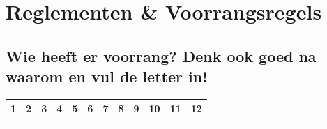 \chapter{Reglementen \& Voorrangsregels}
\vspace{-120px}
\section*{Wie heeft er voorrang? Denk ook goed na waarom en vul de letter in!}
\begin{table}[h!]
\centering
\begin{tabular}{l|l|l|l|l|l|l|l|l|l|l|l}
\textbf{1} & \textbf{2} & \textbf{3} & \textbf{4} & \textbf{5} & \textbf{6} & \textbf{7} & \textbf{8} & \textbf{9} & \textbf{10} & \textbf{11} & \textbf{12} \\ \hline
 \hspace{0.5 cm} & \hspace{0.5 cm}  & \hspace{0.5 cm} & \hspace{0.5 cm} & \hspace{0.5 cm} & \hspace{0.5 cm} & \hspace{0.5 cm} & \hspace{0.5 cm} & \hspace{0.5 cm} & \hspace{0.5 cm} & \hspace{0.5 cm} & \hspace{0.5 cm}
\end{tabular}
\end{table}
